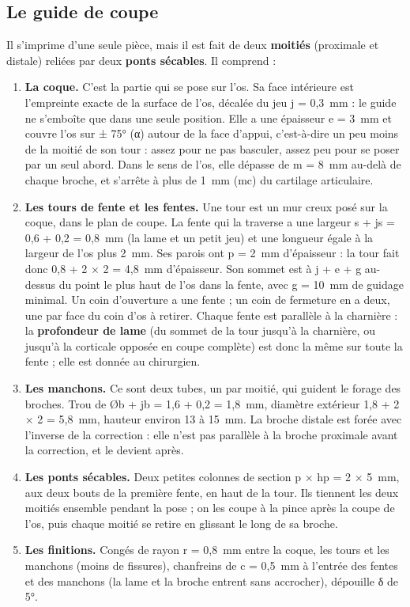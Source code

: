 \documentclass[11pt,a4paper]{article}
\begin{document}
\subsection{Le guide de coupe}

Il s'imprime d'une seule pièce, mais il est fait de deux \textbf{moitiés} (proximale et distale) reliées par deux
\textbf{ponts sécables}. Il comprend :

\begin{enumerate}
  \item \textbf{La coque.} C'est la partie qui se pose sur l'os. Sa face intérieure est l'empreinte exacte de la
        surface de l'os, décalée du jeu j = 0,3~mm : le guide ne s'emboîte que dans une seule position. Elle a une
        épaisseur e = 3~mm et couvre l'os sur ± 75° (α) autour de la face d'appui, c'est-à-dire un peu moins de la
        moitié de son tour : assez pour ne pas basculer, assez peu pour se poser par un seul abord. Dans le sens de
        l'os, elle dépasse de m = 8~mm au-delà de chaque broche, et s'arrête à plus de 1~mm (mc) du cartilage
        articulaire.
  \item \textbf{Les tours de fente et les fentes.} Une tour est un mur creux posé sur la coque, dans le plan de coupe.
        La fente qui la traverse a une largeur s + js = 0,6 + 0,2 = 0,8~mm (la lame et un petit jeu) et une longueur
        égale à la largeur de l'os plus 2~mm. Ses parois ont p = 2~mm d'épaisseur : la tour fait donc
        0,8 + 2 × 2 = 4,8~mm d'épaisseur. Son sommet est à j + e + g au-dessus du point le plus haut de l'os dans la
        fente, avec g = 10~mm de guidage minimal. Un coin d'ouverture a une fente ; un coin de fermeture en a deux,
        une par face du coin d'os à retirer. Chaque fente est parallèle à la charnière : la \textbf{profondeur de lame}
        (du sommet de la tour jusqu'à la charnière, ou jusqu'à la corticale opposée en coupe complète) est donc la même
        sur toute la fente ; elle est donnée au chirurgien.
  \item \textbf{Les manchons.} Ce sont deux tubes, un par moitié, qui guident le forage des broches. Trou de
        Øb + jb = 1,6 + 0,2 = 1,8~mm, diamètre extérieur 1,8 + 2 × 2 = 5,8~mm, hauteur environ 13 à 15~mm. La broche
        distale est forée avec l'inverse de la correction : elle n'est pas parallèle à la broche proximale avant la
        correction, et le devient après.
  \item \textbf{Les ponts sécables.} Deux petites colonnes de section p × hp = 2 × 5~mm, aux deux bouts de la première
        fente, en haut de la tour. Ils tiennent les deux moitiés ensemble pendant la pose ; on les coupe à la pince
        après la coupe de l'os, puis chaque moitié se retire en glissant le long de sa broche.
  \item \textbf{Les finitions.} Congés de rayon r = 0,8~mm entre la coque, les tours et les manchons (moins de
        fissures), chanfreins de c = 0,5~mm à l'entrée des fentes et des manchons (la lame et la broche entrent sans
        accrocher), dépouille δ de 5°.
\end{enumerate}
\end{document}
